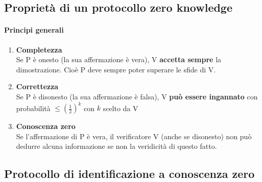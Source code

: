 \documentclass[10pt]{book}
\begin{document}
\subsection{Proprietà di un protocollo zero knowledge}
\paragraph{Principi generali}\begin{enumerate}
	\item \textbf{Completezza}\\
	Se P è onesto (la sua affermazione è vera), V \textbf{accetta sempre} la dimostrazione. Cioè P deve sempre poter superare le sfide di V.
	\item \textbf{Correttezza}\\
	Se P è disonesto (la sua affermazione è falsa), V \textbf{può essere ingannato} con probabilità $\leq \left(\frac{1}{2}\right)^k$ con $k$ scelto da V
	\item \textbf{Conoscenza zero}\\
	Se l'affermazione di P è vera, il verificatore V (anche se disonesto) non può dedurre alcuna informazione se non la veridicità di questo fatto.
\end{enumerate}
\subsection{Protocollo di identificazione a conoscenza zero}
\end{document}
